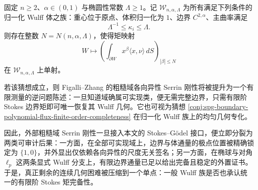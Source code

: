 \begin{conjecture}\label{conj:conclusion-serrin-wulff-finite-stokes-moment-completeness}
固定 \(n\ge 2\)、\(\alpha\in(0,1)\) 与椭圆性常数 \(\Lambda\ge 1\)。记 \(\mathcal W_{n,\alpha,\Lambda}\) 为所有满足下列条件的归一化 Wulff 体之族：重心位于原点、体积归一化为 \(1\)、边界 \(C^{2,\alpha}\)、主曲率满足
\[
\Lambda^{-1}\le \kappa_i\le \Lambda.
\]
则存在整数 \(N=N(n,\alpha,\Lambda)\)，使得矩映射
\[
W\longmapsto
\left(
\int_{\partial W}x^\beta\langle x,\nu\rangle\,dS
\right)_{|\beta|\le N}
\]
在 \(\mathcal W_{n,\alpha,\Lambda}\) 上单射。

若该猜想成立，则 Figalli--Zhang 的粗糙域各向异性 Serrin 刚性将被提升为一个有限测量的逆问题陈述：一旦知道域确属可实现类，便无需完整边界，只需有限阶 Stokes 边界矩即可唯一恢复其 Wulff 几何。它也可视为猜想 \ref{conj:spg-boundary-polynomial-flux-finite-order-completeness} 在归一化 Wulff 族上的均匀几何专化。
\end{conjecture}

\noindent
因此，外部粗糙域 Serrin 刚性一旦接入本文的 Stokes--Gödel 接口，便立即分裂为两类可审计后果：一方面，在全部可实现域上，边界与体通量的极点位置被精确锁定为 \(\{1,0\}\)，并外显出仅依赖各向异性的尺度无关签名；另一方面，在椭球与对角 \(\ell_p\) 这两条显式 Wulff 分支上，有限边界通量已足以给出完备且稳定的外置证书。于是，真正剩余的连续几何困难被压缩到一个单点：一般 Wulff 族是否也承认统一的有限阶 Stokes 矩完备性。

\endinput

